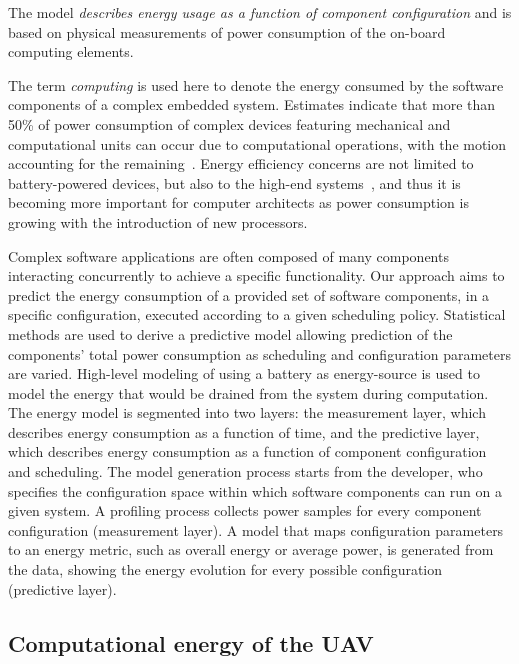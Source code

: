 The model \textit{describes energy usage as a function of component configuration} and is based on physical measurements of power consumption of the on-board computing elements.
%

The term \emph{computing} is used here to denote the energy consumed by the software components of a complex embedded system. Estimates indicate that more than 50\% of power consumption of complex devices featuring mechanical and computational units can occur due to computational operations, with the motion accounting for the remaining~\citep{mei2004energy,mei2005case}. Energy efficiency concerns are not limited to battery-powered devices, but also to the high-end systems~\citep{mudge2001power}, and thus it is becoming more important for computer architects as power consumption is growing with the introduction of new processors. 

Complex software applications are often composed of many components interacting concurrently to achieve a specific functionality. Our approach aims to predict the energy consumption of a provided set of software components, in a specific configuration, executed according to a given scheduling policy. Statistical methods are used to derive a predictive model allowing prediction of the components' total power consumption as scheduling and configuration parameters are varied. High-level modeling of using a battery as energy-source is used to model the energy that would be drained from the system during computation. The energy model is segmented into two layers: the measurement layer, which describes energy consumption as a function of time, and the predictive layer, which describes energy consumption as a function of component configuration and scheduling. The model generation process starts from the developer, who specifies the configuration space within which software components can run on a given system. A profiling process collects power samples for every component configuration (measurement layer). A model that maps configuration parameters to an energy metric, such as overall energy or average power, is generated from the data, showing the energy evolution for every possible configuration (predictive layer).

\subsection{\color{cyan}Computational energy of the UAV}

